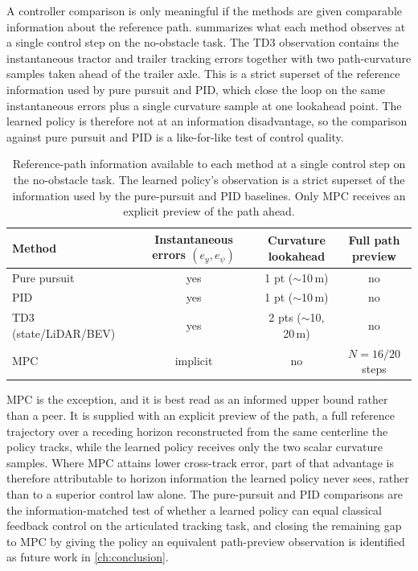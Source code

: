 A controller comparison is only meaningful if the methods are given comparable information about the reference path.  summarizes what each method observes at a single control step on the no-obstacle task. The TD3 observation contains the instantaneous tractor and trailer tracking errors together with two path-curvature samples taken ahead of the trailer axle. This is a strict superset of the reference information used by pure pursuit and PID, which close the loop on the same instantaneous errors plus a single curvature sample at one lookahead point. The learned policy is therefore not at an information disadvantage, so the comparison against pure pursuit and PID is a like-for-like test of control quality.

\begin{table}[H]
\centering
\caption{Reference-path information available to each method at a single control step on the no-obstacle task. The learned policy's observation is a strict superset of the information used by the pure-pursuit and PID baselines. Only MPC receives an explicit preview of the path ahead.}
\label{tab:information_parity}
\begin{tabular}{lccc}
\toprule
Method & \makecell{Instantaneous\\errors $(e_y, e_\psi)$} & \makecell{Curvature\\lookahead} & \makecell{Full path\\preview} \\
\midrule
Pure pursuit          & yes      & 1 pt ($\sim$10\,m)       & no                 \\
PID                   & yes      & 1 pt ($\sim$10\,m)       & no                 \\
TD3 (state/LiDAR/BEV) & yes      & 2 pts ($\sim$10, 20\,m)  & no                 \\
MPC                   & implicit & no                       & $N{=}16/20$ steps   \\
\bottomrule
\end{tabular}
\end{table}

MPC is the exception, and it is best read as an informed upper bound rather than a peer. It is supplied with an explicit preview of the path, a full reference trajectory over a receding horizon reconstructed from the same centerline the policy tracks, while the learned policy receives only the two scalar curvature samples. Where MPC attains lower cross-track error, part of that advantage is therefore attributable to horizon information the learned policy never sees, rather than to a superior control law alone. The pure-pursuit and PID comparisons are the information-matched test of whether a learned policy can equal classical feedback control on the articulated tracking task, and closing the remaining gap to MPC by giving the policy an equivalent path-preview observation is identified as future work in \cref{ch:conclusion}.

